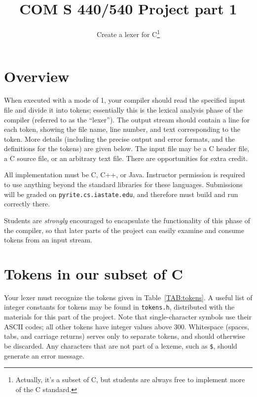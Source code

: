 \documentclass{article}
\title{COM S 440/540 Project part 1}
\author{Create a lexer for C\thanks{Actually, it's a subset of C,
but students are always free to implement more of the C standard.}}
\date{}
\begin{document}
\maketitle

\section{Overview}

When executed with a mode of 1,
your compiler should read the specified input file
and divide it into tokens;
essentially this is the lexical analysis phase of the compiler
(referred to as the ``lexer'').
The output stream should contain
a line for each token,
showing the file name, line number, and text corresponding to the token.
More details (including the precise output and error formats,
and the definitions for the tokens) are given below.
The input file may be a C header file, a C source file,
or an arbitrary text file.
There are opportunities for extra credit.

All implementation must be C, C++, or Java.
Instructor permission is required to use anything beyond
the standard libraries for these languages.
Submissions will be graded on {\tt pyrite.cs.iastate.edu},
and therefore must build and run correctly there.

Students are \emph{strongly} encouraged
to encapsulate the functionality of this phase of the compiler,
so that later parts of the project can easily
examine and consume tokens from an input stream.

\section{Tokens in our subset of C}

Your lexer must recognize the tokens
given in Table~\ref{TAB:tokens}.
A useful list of integer constants for tokens may be found in {\tt tokens.h},
distributed with the materials for this part of the project.
Note that single-character symbols use their ASCII codes;
all other tokens have integer values above 300.
Whitespace (spaces, tabs, and carriage returns) serves only to separate
tokens, and should otherwise be discarded.
Any characters that are not part of a lexeme,
such as \verb|$|,
should generate an error message.
\end{document}
